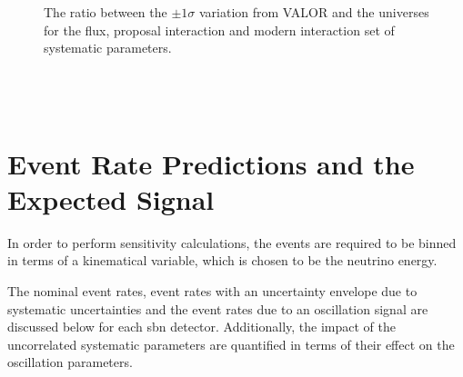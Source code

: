 \begin{figure}[h!]
    \vspace{0.1\textwidth}
  \captionsetup{width=0.45\textwidth}
  \parbox[b]{0.45\textwidth}%
  {
   \caption[The ratio between the $\pm 1 \sigma$ variation from VALOR. and the universes for the flux, proposal interaction and modern interaction set of systematics.]{The ratio between the $\pm 1 \sigma$ variation from VALOR and the universes for the flux, proposal interaction and modern interaction set of systematic parameters.  \\\phantom{.}\\\phantom{.}\\\phantom{.}\\
   \label{fig:1sigma_variations_toys}}
  }
\end{figure}

\clearpage

\section{Event Rate Predictions and the Expected Signal}

In order to perform sensitivity calculations, the events are required to be binned in terms of a kinematical variable, which is chosen to be the neutrino energy.

The nominal event rates, event rates with an uncertainty envelope due to systematic uncertainties and the event rates due to an oscillation signal are discussed below for each \gls{sbn} detector. Additionally, the impact of the uncorrelated systematic parameters are quantified in terms of their effect on the oscillation parameters.



